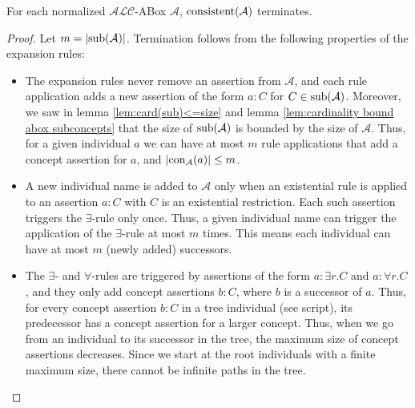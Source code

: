 \begin{lemma}[Termination]\label{lem:abox termination}
	For each normalized $\mathcal{ALC}$-ABox $\mathcal{A}$, $\operatorname{\text{consistent}}(\mathcal{A})$ terminates.
\end{lemma}
\begin{proof}
	Let $m = \lvert \operatorname{\text{sub}}(\mathcal{A}) \rvert$.
	Termination follows from the following properties of the expansion rules:
	\begin{itemize}
		\item The expansion rules never remove an assertion from $\mathcal{A}$,
			and each rule application adds a new assertion of the form $a:C$ for $C \in \operatorname{\text{sub}}(\mathcal{A})$.
			Moreover, we saw in lemma \ref{lem:card(sub)<=size} and lemma \ref{lem:cardinality bound abox subconcepts} that the size of $\operatorname{\text{sub}}(\mathcal{A})$ is bounded by the size of $\mathcal{A}$.
			Thus, for a given individual $a$ we can have at most $m$ rule applications that add a concept assertion for $a$,
			and $\lvert \operatorname{\text{con}}_{\mathcal{A}}(a) \rvert \leq m$.
		\item A new individual name is added to $\mathcal{A}$ only when an existential rule is applied to an assertion $a:C$ with $C$ is an existential restriction.
			Each such assertion triggers the $\exists$-rule only once.
			Thus, a given individual name can trigger the application of the $\exists$-rule at most $m$ times.
			This means each individual can have at most $m$ (newly added) successors.
		\item The $\exists$- and $\forall$-rules are triggered by assertions of the form $a : \exists r.C$ and $a : \forall r.C$, and they only add concept assertions $b:C$, where $b$ is a successor of $a$.
			Thus, for every concept assertion $b:C$ in a tree individual (see script), its predecessor has a concept assertion for a larger concept.
			Thus, when we go from an individual to its successor in the tree, the maximum size of concept assertions decreases.
			Since we start at the root individuals with a finite maximum size, there cannot be infinite paths in the tree. \qedhere
	\end{itemize}
\end{proof}

